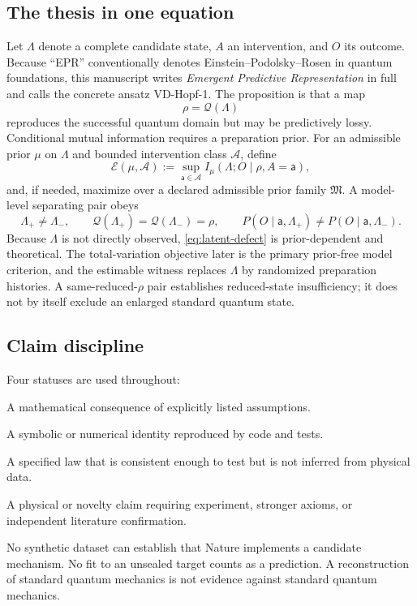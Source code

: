 \documentclass[10pt]{article}
\theoremstyle{definition}
\theoremstyle{remark}
\newcommand{\cQ}{\mathcal Q}
\newcommand{\cE}{\mathcal E}
\newcommand{\status}[1]{\textsf{\small #1}}
\begin{document}
\subsection{The thesis in one equation}

Let \(\Lambda\) denote a complete candidate state, \(A\) an intervention, and \(O\) its outcome. Because ``EPR'' conventionally denotes Einstein--Podolsky--Rosen in quantum foundations, this manuscript writes \emph{Emergent Predictive Representation} in full and calls the concrete ansatz VD-Hopf-1. The proposition is that a map
\begin{equation}
  \rho=\cQ(\Lambda)
  \label{eq:projection}
\end{equation}
reproduces the successful quantum domain but may be predictively lossy. Conditional mutual information requires a preparation prior. For an admissible prior \(\mu\) on \(\Lambda\) and bounded intervention class \(\mathcal A\), define
\begin{equation}
  \cE(\mu,\mathcal A)
  :=
  \sup_{\mathsf a\in\mathcal A}
  I_\mu(\Lambda;O\mid \rho,A=\mathsf a),
  \label{eq:latent-defect}
\end{equation}
and, if needed, maximize over a declared admissible prior family \(\mathfrak M\). A model-level separating pair obeys
\begin{equation}
  \Lambda_+\neq\Lambda_-,
  \qquad
  \cQ(\Lambda_+)=\cQ(\Lambda_-)=\rho,
  \qquad
  P(O\mid\mathsf a,\Lambda_+)
  \neq
  P(O\mid\mathsf a,\Lambda_-).
  \label{eq:golden-pair}
\end{equation}
Because \(\Lambda\) is not directly observed, \cref{eq:latent-defect} is prior-dependent and theoretical. The total-variation objective later is the primary prior-free model criterion, and the estimable witness replaces \(\Lambda\) by randomized preparation histories. A same-reduced-\(\rho\) pair establishes reduced-state insufficiency; it does not by itself exclude an enlarged standard quantum state.

\subsection{Claim discipline}

Four statuses are used throughout:
\begin{description}[style=nextline]
\item[\status{PROVED}] A mathematical consequence of explicitly listed assumptions.
\item[\status{COMPUTED}] A symbolic or numerical identity reproduced by code and tests.
\item[\status{CANDIDATE}] A specified law that is consistent enough to test but is not inferred from physical data.
\item[\status{OPEN}] A physical or novelty claim requiring experiment, stronger axioms, or independent literature confirmation.
\end{description}
No synthetic dataset can establish that Nature implements a candidate mechanism. No fit to an unsealed target counts as a prediction. A reconstruction of standard quantum mechanics is not evidence against standard quantum mechanics.
\end{document}
